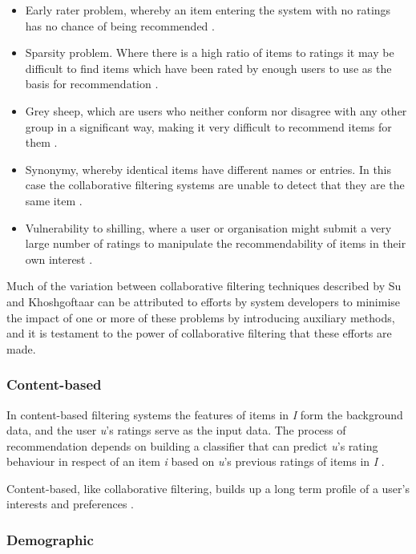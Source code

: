 \begin{itemize}
    \item Early rater problem, whereby an item entering the system with no ratings has no chance of being recommended \cite{Claypool99}.
    \item Sparsity problem. Where there is a high ratio of items to ratings it may be difficult to find items which have been rated by enough users to use as the basis for recommendation \cite{Claypool99} \cite{Su09}.
    \item Grey sheep, which are users who neither conform nor disagree with any other group in a significant way, making it very difficult to recommend items for them \cite{Claypool99} \cite{Su09}.
    \item Synonymy, whereby identical items have different names or entries. In this case the collaborative filtering systems are unable to detect that they are the same item \cite{Su09}.
    \item Vulnerability to shilling, where a user or organisation might submit a very large number of ratings to manipulate the recommendability of items in their own interest \cite{Su09}.
\end{itemize}

Much of the variation between collaborative filtering techniques described by Su and Khoshgoftaar \cite{Su09} can be attributed to efforts by system developers to minimise the impact of one or more of these problems by introducing auxiliary methods, and it is testament to the power of collaborative filtering that these efforts are made.

\subsubsection{Content-based}

In content-based filtering systems the features of items in \textit{I} form the background data, and the user \textit{u}'s ratings serve as the input data. The process of recommendation depends on building a classifier that can predict \textit{u}'s rating behaviour in respect of an item \textit{i} based on \textit{u}'s previous ratings of items in \textit{I} \cite{Burke02}.

Content-based, like collaborative filtering, builds up a long term profile of a user's interests and preferences \cite{Burke02}.

\subsubsection{Demographic}

